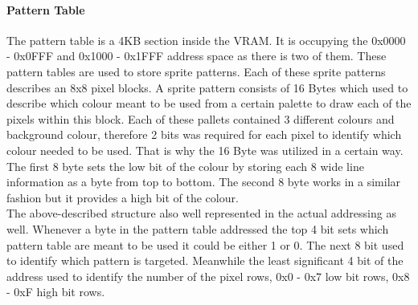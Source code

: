 \documentclass[]{report}
\begin{document}
\paragraph{Pattern Table} 
The pattern table \cite{PTRN} is a 4KB section inside the VRAM. It is occupying the 0x0000 - 0x0FFF and 0x1000 - 0x1FFF address space as there is two of them.  These pattern tables are used to store sprite patterns.  Each of these sprite patterns describes an 8x8 pixel blocks. A sprite pattern consists of 16 Bytes which used to describe which colour meant to be used from a certain palette to draw each of the pixels within this block.  Each of these pallets contained 3 different colours and background colour, therefore 2 bits was required for each pixel to identify which colour needed to be used. That is why the 16 Byte was utilized in a certain way. The first 8 byte sets the low bit of the colour by storing each 8 wide line information as a byte from top to bottom. The second 8 byte works in a similar fashion but it provides a high bit of the colour.
\\
The above-described structure also well represented in the actual addressing as well. Whenever a byte in the pattern table addressed the top 4 bit sets which pattern table are meant to be used it could be either 1 or 0. The next 8 bit used to identify which pattern is targeted. Meanwhile the least significant 4 bit of the address used to identify the number of the pixel rows, 0x0 - 0x7 low bit rows, 0x8 - 0xF high bit rows.
\end{document}
